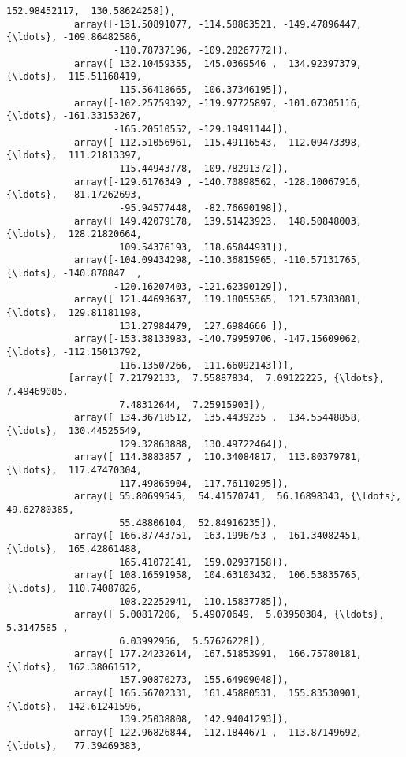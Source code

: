 \documentclass[11pt]{article}
\begin{document}
\begin{Verbatim}[commandchars=\\\{\}]
                    152.98452117,  130.58624258]),
            array([-131.50891077, -114.58863521, -149.47896447, {\ldots}, -109.86482586,
                   -110.78737196, -109.28267772]),
            array([ 132.10459355,  145.0369546 ,  134.92397379, {\ldots},  115.51168419,
                    115.56418665,  106.37346195]),
            array([-102.25759392, -119.97725897, -101.07305116, {\ldots}, -161.33153267,
                   -165.20510552, -129.19491144]),
            array([ 112.51056961,  115.49116543,  112.09473398, {\ldots},  111.21813397,
                    115.44943778,  109.78291372]),
            array([-129.6176349 , -140.70898562, -128.10067916, {\ldots},  -81.17262693,
                    -95.94577448,  -82.76690198]),
            array([ 149.42079178,  139.51423923,  148.50848003, {\ldots},  128.21820664,
                    109.54376193,  118.65844931]),
            array([-104.09434298, -110.36815965, -110.57131765, {\ldots}, -140.878847  ,
                   -120.16207403, -121.62390129]),
            array([ 121.44693637,  119.18055365,  121.57383081, {\ldots},  129.81181198,
                    131.27984479,  127.6984666 ]),
            array([-153.38133983, -140.79959706, -147.15609062, {\ldots}, -112.15013792,
                   -116.13507266, -111.66092143])],
           [array([ 7.21792133,  7.55887834,  7.09122225, {\ldots},  7.49469085,
                    7.48312644,  7.25915903]),
            array([ 134.36718512,  135.4439235 ,  134.55448858, {\ldots},  130.44525549,
                    129.32863888,  130.49722464]),
            array([ 114.3883857 ,  110.34084817,  113.80379781, {\ldots},  117.47470304,
                    117.49865904,  117.76110295]),
            array([ 55.80699545,  54.41570741,  56.16898343, {\ldots},  49.62780385,
                    55.48806104,  52.84916235]),
            array([ 166.87743751,  163.1996753 ,  161.34082451, {\ldots},  165.42861488,
                    165.41072141,  159.02937158]),
            array([ 108.16591958,  104.63103432,  106.53835765, {\ldots},  110.74087826,
                    108.22252941,  110.15837785]),
            array([ 5.00817206,  5.49070649,  5.03950384, {\ldots},  5.3147585 ,
                    6.03992956,  5.57626228]),
            array([ 177.24232614,  167.51853991,  166.75780181, {\ldots},  162.38061512,
                    157.90870273,  155.64909048]),
            array([ 165.56702331,  161.45880531,  155.83530901, {\ldots},  142.61241596,
                    139.25038808,  142.94041293]),
            array([ 122.96826844,  112.1844671 ,  113.87149692, {\ldots},   77.39469383,

\end{Verbatim}
\end{document}
